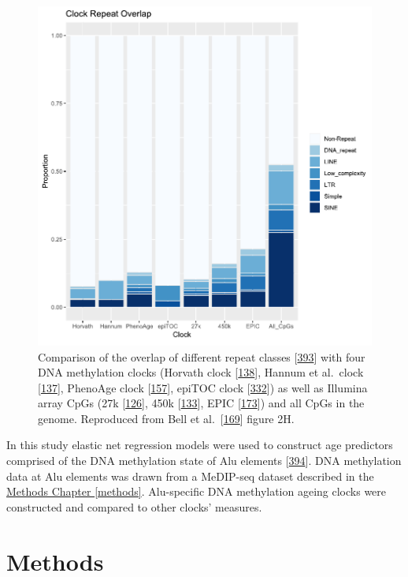 \documentclass[
]{book}
\begin{document}
\begin{figure}

{\centering \includegraphics[width=0.6\linewidth]{./figs/Bell_2019_Clock_repeats_CpG} 

}

\caption{Comparison of the overlap of different repeat classes {[}\protect\hyperlink{ref-Smit2009}{393}{]} with four DNA methylation clocks (Horvath clock {[}\protect\hyperlink{ref-Horvath2013}{138}{]}, Hannum et al.~clock {[}\protect\hyperlink{ref-Hannum2013}{137}{]}, PhenoAge clock {[}\protect\hyperlink{ref-Levine2018}{157}{]}, epiTOC clock {[}\protect\hyperlink{ref-Yang2016}{332}{]}) as well as Illumina array CpGs (27k {[}\protect\hyperlink{ref-Bibikova2009}{126}{]}, 450k {[}\protect\hyperlink{ref-Bibikova2011}{133}{]}, EPIC {[}\protect\hyperlink{ref-Moran2015}{173}{]}) and all CpGs in the genome. Reproduced from Bell et al.~{[}\protect\hyperlink{ref-Bell2019}{169}{]} figure 2H.}\label{fig:clockRepeatCpGs}
\end{figure}



In this study elastic net regression models were used to construct age predictors comprised of the DNA methylation state of Alu elements {[}\protect\hyperlink{ref-Prive2019}{394}{]}.
DNA methylation data at Alu elements was drawn from a MeDIP-seq dataset described in the \protect\hyperlink{methods}{Methods Chapter \ref{methods}}.
Alu-specific DNA methylation ageing clocks were constructed and compared to other clocks' measures.

\newpage

\hypertarget{Alu-Methods}{%
\section{Methods}\label{Alu-Methods}}
\end{document}
